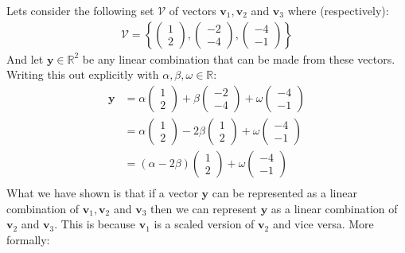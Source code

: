 \documentclass[a4paper,12pt]{book}
\newcommand{\set}[1]{\mathcal{#1}}
\newcommand{\vectr}[1]{\textbf{#1}}
\newcommand{\real}{\mathbb{R}}
\begin{document}
	Lets consider the following set $\set{V}$ of vectors $\vectr{v}_1,\vectr{v}_2 $ and $ \vectr{v}_3$ where (respectively):
	\begin{align}
		\set{V} = \left\{\begin{pmatrix} 1 \\ 2 \end{pmatrix},\begin{pmatrix} -2 \\ -4 \end{pmatrix},\begin{pmatrix} -4 \\ -1 \end{pmatrix} \right\}
	\end{align}
	And let $\vectr{y} \in \real^2$ be any linear combination that can be made from these vectors. Writing this out explicitly with $\alpha, \beta, \omega \in \real$:
	\begin{align}
		\vectr{y} &= \alpha \begin{pmatrix} 1 \\ 2 \end{pmatrix} + \beta \begin{pmatrix} -2 \\ -4 \end{pmatrix} + \omega \begin{pmatrix} -4 \\ -1 \end{pmatrix} \\
		&= \alpha \begin{pmatrix} 1 \\ 2 \end{pmatrix} - 2\beta \begin{pmatrix} 1 \\ 2 \end{pmatrix} + \omega \begin{pmatrix} -4 \\ -1 \end{pmatrix} \\
		&= (\alpha - 2\beta) \begin{pmatrix} 1 \\ 2 \end{pmatrix} + \omega \begin{pmatrix} -4 \\ -1 \end{pmatrix} \\
	\end{align} 
	What we have shown is that if a vector $ \vectr{y} $ can be represented as a linear combination of $ \vectr{v}_1,\vectr{v}_2 $ and $ \vectr{v}_3 $ then we can represent $ \vectr{y} $ as a linear combination of $ \vectr{v}_2 $ and $ \vectr{v}_3 $. This is because $ \vectr{v}_1 $ is a scaled version of $ \vectr{v}_2 $ and vice versa. 
	More formally:
	
\end{document}
